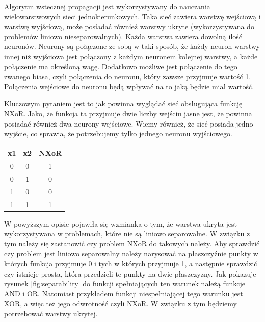 Algorytm wstecznej propagacji jest wykorzystywany do nauczania wielowarstwowych sieci jednokierunkowych.
Taka sieć zawiera warstwę wejściową i warstwę wyjściową,
może posiadać również warstwy ukryte (wykorzystywana do problemów liniowo nieseparowalnych).
Każda warstwa zawiera dowolną ilość neuronów.
Neurony są połączone ze sobą w taki sposób, że każdy neuron warstwy innej niż wyjściowa jest połączony z każdym neuronem kolejnej warstwy,
a każde połączenie ma określoną wagę.
Dodatkowo możliwe jest połączenie do tego zwanego biasa, czyli połączenia do neuronu, który zawsze przyjmuje wartość 1.
Połączenia wejściowe do neuronu będą wpływać na to jaką będzie miał wartość.

Kluczowym pytaniem jest to jak powinna wyglądać sieć obsługująca funkcję NXoR. 
Jako, że funkcja ta przyjmuje dwie liczby wejściu jasne jest, że powinna posiadać również dwa neurony wejściowe.
Wiemy również, że sieć posiada jedno wyjście, co sprawia, że potrzebujemy tylko jednego neuronu wyjściowego.

\begin{center}
  \begin{tabular}{||c c c||} 
  \hline
  x1 & x2 & NXoR \\ [0.5ex] 
  \hline\hline
  0 & 0 & 1\\ 
  \hline
  0 & 1 & 0 \\
  \hline
  1 & 0 & 0 \\
  \hline
  1 & 1 & 1 \\ [0.5ex] 
  \hline
 \end{tabular}
 \end{center}
 
W powyższym opisie pojawiła się wzmianka o tym, że warstwa ukryta jest wykorzystywana w problemach, które nie są liniowo separowalne.
W związku z tym należy się zastanowić czy problem NXoR do takowych należy.
Aby sprawdzić czy problem jest liniowo separowalny należy narysować na płaszczyźnie punkty w których funkcja przyjmuje 0 i tych w których przyjmuje 1, a następnie sprawdzić czy istnieje prosta, która przedzieli te punkty na dwie płaszczyzny.
Jak pokazuje rysunek \ref{fig:separability} do funkcji spełniających ten warunek należą funkcje AND i OR.
Natomiast przykładem funkcji niespełniającej tego warunku jest XOR, a więc też jego odwrotność czyli NXoR.
W związku z tym będziemy potrzebować warstwy ukrytej.
 
